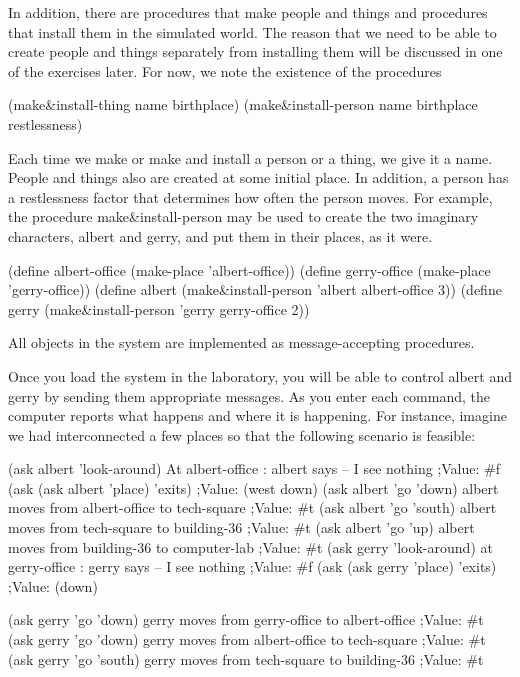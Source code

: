 In addition, there are procedures that make people and things and
procedures that install them in the simulated world.  The reason that
we need to be able to create people and things separately from
installing them will be discussed in one of the exercises later.  For
now, we note the existence of the procedures

\beginlisp
  (make\&install-thing  name birthplace)
  (make\&install-person name birthplace restlessness)
\endlisp

Each time we make or make and install a person or a thing, we give it
a name.  People and things also are created at some initial place.  In
addition, a person has a restlessness factor that determines how often
the person moves. For example, the procedure {\cf
make\&install-person} may be used to create the two imaginary
characters, {\cf albert} and {\cf gerry}, and put them in their
places, as it were.

\beginlisp
  (define albert-office (make-place 'albert-office))
  (define gerry-office  (make-place 'gerry-office))
\null
  (define albert (make\&install-person 'albert albert-office 3))
  (define gerry  (make\&install-person 'gerry  gerry-office  2))
\endlisp

All objects in the system are implemented as message-accepting
procedures.

Once you load the system in the laboratory, you will be able to
control {\cf albert} and {\cf gerry} by sending them appropriate messages.
As you enter each command, the computer reports what happens and where
it is happening. For instance, imagine we had interconnected a few
places so that the following scenario is feasible:

\beginlisp
(ask albert 'look-around)
At albert-office : albert says -- I see nothing
;Value: \#f
\null
(ask (ask albert 'place) 'exits)
;Value: (west down)
\null
(ask albert 'go 'down)
albert moves from albert-office to tech-square
;Value: \#t
\null
(ask albert 'go 'south)
albert moves from tech-square to building-36
;Value: \#t
\null
(ask albert 'go 'up)
albert moves from building-36 to computer-lab
;Value: \#t
\null
(ask gerry 'look-around)
at gerry-office : gerry says -- I see nothing
;Value: \#f
\null
(ask (ask gerry 'place) 'exits)
;Value: (down)
\endlisp

\beginlisp
(ask gerry 'go 'down)
gerry moves from gerry-office to albert-office
;Value: \#t
\null
(ask gerry 'go 'down)
gerry moves from albert-office to tech-square
;Value: \#t
\null
(ask gerry 'go 'south)
gerry moves from tech-square to building-36
;Value: \#t
\endlisp

